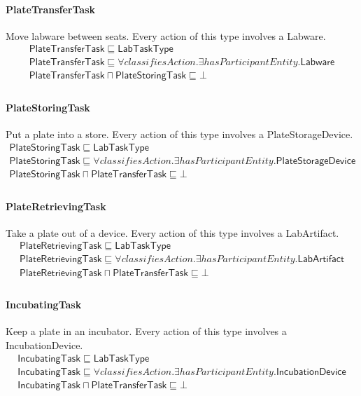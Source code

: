 \documentclass[10pt]{article}
\begin{document}
\paragraph{PlateTransferTask} Move labware between seats. Every action of this type involves a Labware.
\[\begin{array}{l}
\mathsf{PlateTransferTask} \sqsubseteq  \mathsf{LabTaskType} \\
\mathsf{PlateTransferTask} \sqsubseteq  \forall \mathit{classifiesAction}.\exists \mathit{hasParticipantEntity}.\mathsf{Labware} \\
\mathsf{PlateTransferTask} \sqcap  \mathsf{PlateStoringTask} \sqsubseteq  \bot  \\
\end{array}\]
\paragraph{PlateStoringTask} Put a plate into a store. Every action of this type involves a PlateStorageDevice.
\[\begin{array}{l}
\mathsf{PlateStoringTask} \sqsubseteq  \mathsf{LabTaskType} \\
\mathsf{PlateStoringTask} \sqsubseteq  \forall \mathit{classifiesAction}.\exists \mathit{hasParticipantEntity}.\mathsf{PlateStorageDevice} \\
\mathsf{PlateStoringTask} \sqcap  \mathsf{PlateTransferTask} \sqsubseteq  \bot  \\
\end{array}\]
\paragraph{PlateRetrievingTask} Take a plate out of a device. Every action of this type involves a LabArtifact.
\[\begin{array}{l}
\mathsf{PlateRetrievingTask} \sqsubseteq  \mathsf{LabTaskType} \\
\mathsf{PlateRetrievingTask} \sqsubseteq  \forall \mathit{classifiesAction}.\exists \mathit{hasParticipantEntity}.\mathsf{LabArtifact} \\
\mathsf{PlateRetrievingTask} \sqcap  \mathsf{PlateTransferTask} \sqsubseteq  \bot  \\
\end{array}\]
\paragraph{IncubatingTask} Keep a plate in an incubator. Every action of this type involves a IncubationDevice.
\[\begin{array}{l}
\mathsf{IncubatingTask} \sqsubseteq  \mathsf{LabTaskType} \\
\mathsf{IncubatingTask} \sqsubseteq  \forall \mathit{classifiesAction}.\exists \mathit{hasParticipantEntity}.\mathsf{IncubationDevice} \\
\mathsf{IncubatingTask} \sqcap  \mathsf{PlateTransferTask} \sqsubseteq  \bot  \\
\end{array}\]
\end{document}
